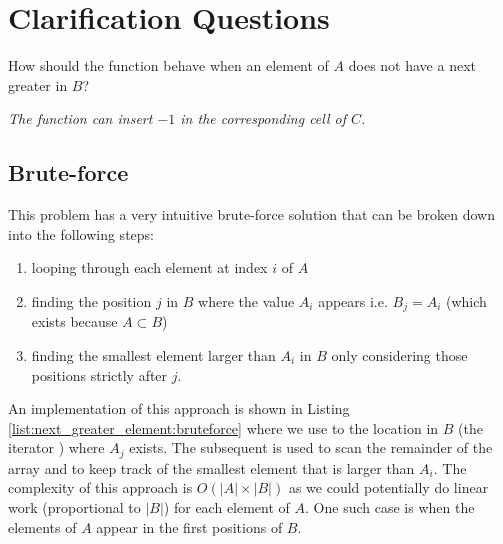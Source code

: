 \section{Clarification Questions}

\begin{QandA}
	\item \begin{questionitem} \begin{question} How should the function behave when an element of $A$ does not have a next greater in $B$?  \end{question} 	 
    \begin{answered}
		\textit{The function can insert $-1$ in the corresponding cell of $C$.}
	\end{answered} \end{questionitem}
	
\end{QandA}

\subsection{Brute-force}
\label{next_greater_element:sec:bruteforce}
This problem has a very intuitive brute-force solution that can be broken down into the following steps:
\begin{enumerate}
	\item looping through each element at index $i$ of $A$
	\item finding the position $j$ in $B$ where the value $A_i$ appears i.e. $B_j = A_i$ (which
	exists because $A \subset B$)
	\item finding the smallest element larger than $A_i$ in $B$ only considering those positions strictly
	after $j$.
\end{enumerate}
An implementation of this approach is shown in Listing \ref{list:next_greater_element:bruteforce}
where we use  to the location in $B$ (the iterator ) where $A_j$
exists. The subsequent  is used to scan the remainder of the array and to keep track
of the smallest element that is larger than $A_i$. The complexity of this approach is $O(|A| \times
|B|)$ as we could potentially do linear  work (proportional to $|B|$) for each  element of
$A$. One such case is when the elements of $A$ appear in the first positions of $B$. 



